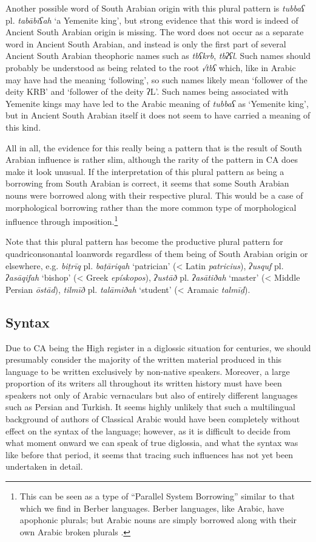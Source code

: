 \documentclass[output=paper]{langsci/langscibook}
\begin{document}
Another possible word of South Arabian origin with this plural pattern is \textit{tubbaʕ} pl. \textit{tabābiʕah} ‘a Yemenite king’, but strong evidence that this word is indeed of Ancient South Arabian origin is missing. The word does not occur as a separate word in Ancient South Arabian, and instead is only the first part of several Ancient South Arabian theophoric names such as \textit{tbʕkrb}, \textit{tbʔʕl}. Such names should probably be understood as being related to the root \textit{√tbʕ} which, like in Arabic may have had the meaning ‘following’, so such names likely mean ‘follower of the deity KRB’ and ‘follower of the deity ʔL’. Such names being associated with Yemenite kings may have led to the Arabic meaning of \textit{tubbaʕ} as ‘Yemenite king’, but in Ancient South Arabian itself it does not seem to have carried a meaning of this kind. 

All in all, the evidence for this really being a pattern that is the result of South Arabian influence is rather slim, although the rarity of the pattern in CA does make it look unusual. If the interpretation of this plural pattern as being a borrowing from South Arabian is correct, it seems that some South Arabian nouns were borrowed along with their respective plural. This would be a case of morphological borrowing rather than the more common type of morphological influence through imposition.\footnote{This can be seen as a type of “Parallel System Borrowing” similar to that which we find in Berber languages. Berber languages, like Arabic, have apophonic plurals; but Arabic nouns are simply borrowed along with their own Arabic broken plurals \citep{Kossmann2010}.} 

Note that this plural pattern has become the productive plural pattern for quadriconsonantal loanwords regardless of them being of South Arabian origin or elsewhere, e.g. \textit{biṭrīq} pl. \textit{baṭāriqah} ‘patrician’ (< Latin \textit{patricius}), \textit{ʔusquf} pl. \textit{ʔasāqifah} ‘bishop’ (< Greek \textit{epískopos}), \textit{ʔustāð} pl. \textit{ʔasātiðah} ‘master’ (< Middle Persian \textit{ōstād}), \textit{tilmīð} pl. \textit{talāmiðah} ‘student’ (< Aramaic \textit{talmīḏ}).

\subsection{\label{bkm:Ref13224809}Syntax}

Due to CA being the High register in a diglossic situation for centuries, we should presumably consider the majority of the written material produced in this language to be written exclusively by non-native speakers. Moreover, a large proportion of its writers all throughout its written history must have been speakers not only of Arabic vernaculars but also of entirely different languages such as Persian and Turkish. It seems highly unlikely that such a multilingual background of authors of Classical Arabic would have been completely without effect on the syntax of the language; however, as it is difficult to decide from what moment onward we can speak of true diglossia, and what the syntax was like before that period, it seems that tracing such influences has not yet been undertaken in detail.
\end{document}
